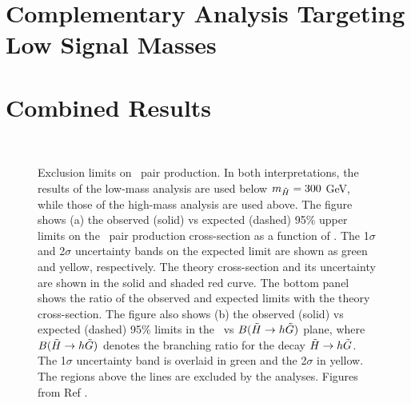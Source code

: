 \section{Complementary Analysis Targeting Low Signal Masses}
\label{sec:ewk:LM}

\section{Combined Results}

\begin{figure}[htbp]
	\centering
	\\
	\caption{Exclusion limits on \hino\ pair production. In both interpretations, the results of the low-mass analysis are used below $m_{\tilde{H}} = 300$ GeV, while those of the high-mass analysis are used above. The figure shows (a) the observed (solid) vs expected (dashed) 95\% upper limits on the \hino\ pair production cross-section as a function of \mhino.  The 1$\sigma$ and 2$\sigma$ uncertainty bands on the expected limit are shown as green and yellow, respectively. The theory cross-section and its uncertainty are shown in the solid and shaded red curve. The bottom panel shows the ratio of the observed and expected limits with the theory cross-section. The figure also shows (b) the observed (solid) vs expected (dashed) 95\% limits in the \mhino\ vs $B(\tilde{H}\rightarrow h \tilde{G})$ plane, where $B(\tilde{H}\rightarrow h \tilde{G})$ denotes the branching ratio for the decay $\tilde{H} \rightarrow h \tilde{G}$. The 1$\sigma$ uncertainty band is overlaid in green and the 2$\sigma$ in yellow. The regions above the lines are excluded by the analyses. Figures from Ref \cite{Aaboud:2018htj}. } 
	\label{fig:exclusion}
\end{figure}
